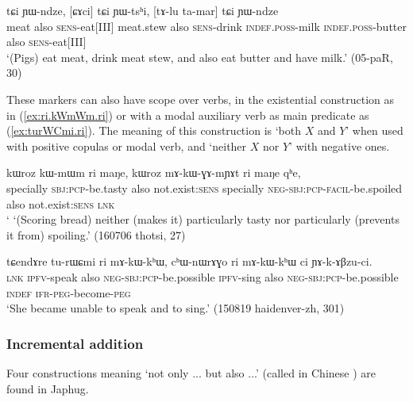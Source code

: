  \begin{exe}
\ex \label{ex:tCi.YWtshi.tCi.YWndze}
\gll [ɕa] tɕi ɲɯ-ndze, [ɕɤci] tɕi ɲɯ-tsʰi, [tɤ-lu ta-mar] tɕi ɲɯ-ndze  \\
meat also \textsc{sens}-eat[III] meat.stew also \textsc{sens}-drink  \textsc{indef}.\textsc{poss}-milk \textsc{indef}.\textsc{poss}-butter also \textsc{sens}-eat[III] \\
\glt  `(Pigs) eat meat, drink meat stew, and also eat butter and have milk.' (05-paR, 30)
\end{exe}

These markers can also have scope over verbs, in the existential construction as in (\ref{ex:ri.kWmWm.ri}) or with a modal auxiliary verb as main predicate as (\ref{ex:turWCmi.ri}). The meaning of this construction is `both $X$ and $Y$' when used with positive copulas or modal verb, and `neither $X$ nor $Y$' with negative ones.  

 \begin{exe}
\ex \label{ex:ri.kWmWm.ri}
 \gll   kɯroz kɯ-mɯm ri maŋe, kɯroz mɤ-kɯ-ɣɤ-mɲɤt ri maŋe qʰe, \\
specially \textsc{sbj}:\textsc{pcp}-be.tasty also not.exist:\textsc{sens} specially \textsc{neg}-\textsc{sbj}:\textsc{pcp}-\textsc{facil}-be.spoiled also not.exist:\textsc{sens} \textsc{lnk} \\
 \glt ` `(Scoring bread) neither (makes it) particularly tasty nor particularly (prevents it from) spoiling.'   (160706 thotsi, 27)
  \end{exe}

 \begin{exe}
\ex \label{ex:turWCmi.ri}
 \gll   tɕendɤre tu-rɯɕmi ri mɤ-kɯ-kʰɯ, cʰɯ-nɯrɤɣo ri mɤ-kɯ-kʰɯ ci ɲɤ-k-ɤβzu-ci. \\
 \textsc{lnk} \textsc{ipfv}-speak also \textsc{neg}-\textsc{sbj}:\textsc{pcp}-be.possible  \textsc{ipfv}-sing also \textsc{neg}-\textsc{sbj}:\textsc{pcp}-be.possible  \textsc{indef} \textsc{ifr}-\textsc{peg}-become-\textsc{peg} \\
 \glt `She became unable to speak and to sing.' (150819 haidenver-zh, 301)
 \end{exe}
 
\subsubsection{Incremental addition} \label{sec:incremental.addition}
Four constructions meaning `not only ... but also ...' (called in Chinese ) are found in Japhug.

